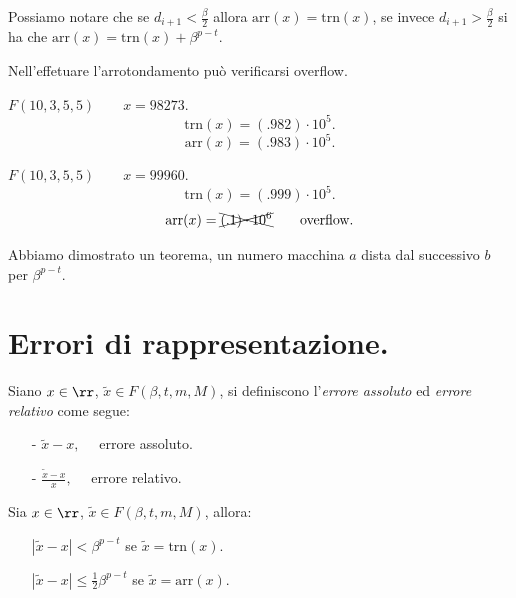 Possiamo notare che se $d_{i+1} < \frac{\beta}{2}$ allora $\textrm{arr}(x)
= \textrm{trn}(x)$, se invece $d_{i+1} > \frac{\beta}{2}$ si ha che 
$\textrm{arr}(x) = \textrm{trn}(x) + \beta^{p-t}$. 
\begin{notabene}
Nell'effetuare l'arrotondamento può verificarsi overflow.
\end{notabene}

\begin{exe}
$F(10,3,5,5)\qquad x = 98273$.
\[\textrm{trn}(x) = (.982)\cdot 10^{5}.\]
\[\textrm{arr}(x) = (.983)\cdot 10^{5}.\]
\end{exe}
\begin{exe}
$F(10,3,5,5)\qquad x = 99960$.
\[\textrm{trn}(x) = (.999)\cdot 10^{5}.\]
\[\textrm{arr}(x) = \xcancel{(.1)\cdot 10^{6}} \qquad \textrm{overflow}.\]
\end{exe}

\begin{notabene}
Abbiamo dimostrato un teorema, un numero macchina $a$ dista dal successivo $b$
per $\beta^{p-t}$.
\end{notabene}

\section{Errori di rappresentazione.}
\begin{defi}Siano $x \in \rr$, $\tilde{x} \in F(\beta,t,m,M)$, si
definiscono l'\emph{errore assoluto} ed \emph{errore relativo} come segue:
\begin{itemize}
\item[-] $\tilde{x} - x, \quad$ errore assoluto.
\item[-] $\frac{\tilde{x} - x}{x}, \quad$ errore relativo.
\end{itemize}
\end{defi}

\begin{teo}Sia $x \in \rr$, $\tilde{x} \in F(\beta,t,m,M)$, allora:
\begin{itemize}
\item[]$|\tilde{x} - x| < \beta^{p-t}$ se $\tilde{x} = \textrm{trn}(x)$.
\item[]$|\tilde{x} - x| \leq \frac{1}{2}\beta^{p-t}$ se $\tilde{x} = 
\textrm{arr}(x)$.
\end{itemize}
\end{teo}


